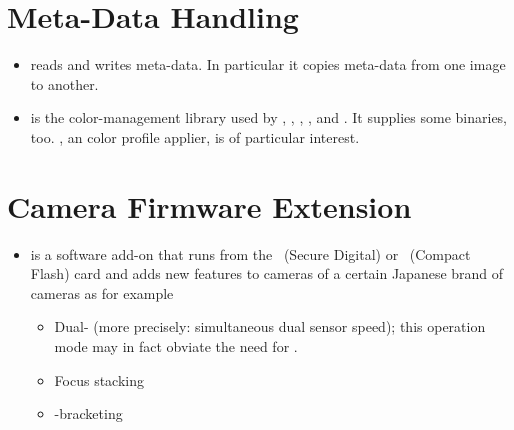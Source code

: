 \section[Meta-Data Handling]{\label{sec:meta-data-handling}%
  Meta-Data Handling}

\begin{itemize}
  \label{app:exiftool}%
\item
   reads and writes  meta-data.  In
  particular it copies meta-data from one image to another.

  \label{app:littlecms}%
\item
   is the color-management library used by ,
  , , \App, and \OtherApp.  It supplies some binaries,
  too.  , an  color profile applier, is of particular interest.
\end{itemize}


\section[Camera Firmware Extension]{\label{sec:camera-firmware-extension}%
  Camera Firmware Extension}

\begin{itemize}
  \label{app:magiclantern}%
\item
   is a software add-on that runs from the
  ~(Secure Digital) or ~(Compact Flash) card and adds new features to
  cameras of a certain Japanese brand of cameras as for example

  \begin{itemize}
  \item
    Dual- (more precisely: simultaneous dual sensor speed); this operation mode may
    in fact obviate the need for .

  \item
    Focus stacking

  \item
    -bracketing
  \end{itemize}
\end{itemize}



